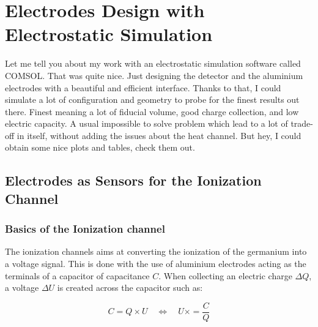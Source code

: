 
\chapter{Electrodes Design with Electrostatic Simulation} %

\label{ChapterElectrodes} %


Let me tell you about my work with an electrostatic simulation software called COMSOL.
That was quite nice. Just designing the detector and the aluminium electrodes with a beautiful and efficient interface.
Thanks to that, I could simulate a lot of configuration and geometry to probe for the finest results out there.
Finest meaning a lot of fiducial volume, good charge collection, and low electric capacity.
A usual impossible to solve problem which lead to a lot of trade-off in itself, without adding the issues about the heat channel.
But hey, I could obtain some nice plots and tables, check them out.


\section{Electrodes as Sensors for the Ionization Channel}

\subsection{Basics of the Ionization channel}
\label{par:basic-ion-channel}

The ionization channels aims at converting the ionization of the germanium into a voltage signal.
This is done with the use of aluminium electrodes acting as the terminals of a capacitor of capacitance $C$. When collecting an electric charge $\Delta Q$, a voltage $\Delta U$ is created across the capacitor such as:

\begin{equation}
C = Q \times U \quad \Leftrightarrow \quad U \times = \frac{C}{Q}
\label{eq:capacitor-basic}
\end{equation}

